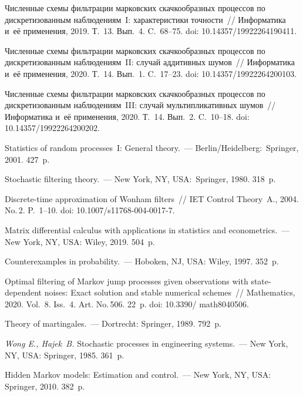 \begin{multicols}{2}
{\small\frenchspacing
{%
\begin{thebibliography}{99}

   Численные схемы фильтрации марковских скачкообразных процессов по дискретизованным 
  наблюдениям~I: характеристики точности~// Информатика и~её применения, 2019. Т.~13. Вып.~4. C.~68--75. 
doi: 10.14357/19922264190411.


   Численные схемы фильтрации марковских скачкообразных процессов по
   дискретизованным наблюдениям~II: случай аддитивных шумов~// Информатика и~её применения, 2020. Т.~14.
   Вып.~1. C.~17--23. doi: 10.14357/19922264200103.
 
   Численные схемы фильтрации марковских скачкообразных процессов по 
  дискретизованным наблюдениям~III: случай мультипликативных шумов~// Информатика и~её применения, 
  2020. Т.~14. Вып.~2. C.~10--18. 
  doi: 10.14357/19922264200202.


  Statistics of random processes~I: General theory.~--- 
 Berlin/Heidelberg:~Springer, 2001. 427~p.

  Stochastic filtering theory.~--- New York, NY, USA:~Springer, 1980. 318~p.

Discrete-time approximation of Wonham filters~//
IET Control Theory~A., 2004. No.\,2. P.~1--10. doi: 10.1007/s11768-004-0017-7.


  Matrix differential calculus with applications in statistics and econometrics.~--- 
  New York, NY, USA: Wiley, 2019. 504~p.

 Counterexamples in probability.~--- Hoboken, NJ, USA: Wiley, 1997. 352~p.

  Optimal filtering of Markov jump processes given 
 observations with state-dependent noises: Exact solution and stable numerical schemes~// Mathematics, 2020. 
 Vol.~8. Iss.~4. Art. No.\,506. 22~p. doi: 10.3390/ math8040506.

  Theory   of   martingales.~---  Dortrecht: Springer, 1989. 792~p.

 {\it Wong E., Hajek~B.} Stochastic processes in engineering systems.~--- New York, NY, USA:
 Springer, 1985. 361~p.

 Hidden Markov models: Estimation and control.~--- New York, NY, USA:
 Springer, 2010. 382~p.


 \end{thebibliography}

}
}

\end{multicols}


